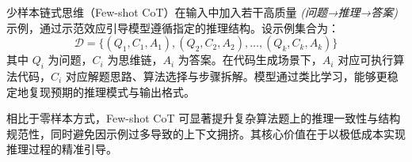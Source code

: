 
少样本链式思维（Few-shot CoT）在输入中加入若干高质量 \textit{(问题→推理→答案)} 示例，通过示范效应引导模型遵循指定的推理结构。设示例集合为：
\[
\mathcal{D} = \{(Q_1, C_1, A_1), (Q_2, C_2, A_2), \dots, (Q_k, C_k, A_k)\}
\]
其中 \(Q_i\) 为问题，\(C_i\) 为思维链，\(A_i\) 为答案。在代码生成场景下，\(A_i\) 对应可执行算法代码，\(C_i\) 对应解题思路、算法选择与步骤拆解。模型通过类比学习，能够更稳定地复现预期的推理模式与输出格式。

相比于零样本方式，Few-shot CoT 可显著提升复杂算法题上的推理一致性与结构规范性，同时避免因示例过多导致的上下文拥挤\cite{wei2022chain}。其核心价值在于以极低成本实现推理过程的精准引导。